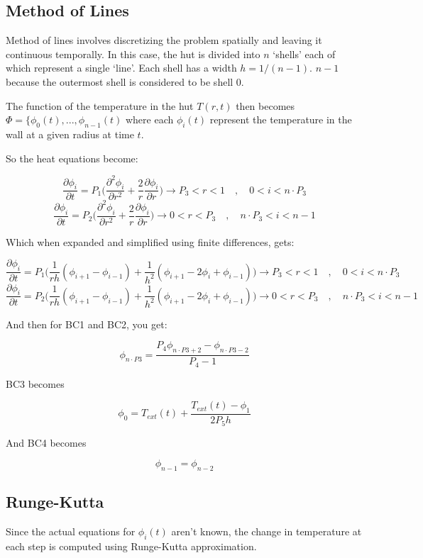 \documentclass{article}
\begin{document}
\subsection{Method of Lines}

Method of lines involves discretizing the problem spatially and leaving it continuous temporally. In this case, the hut is divided into $n$ `shells' each of which represent a single `line'. Each shell has a width $h = 1/(n-1)$. $n-1$ because the outermost shell is considered to be shell 0.

The function of the temperature in the hut $T(r,t)$ then becomes $\Phi = \{\phi_0(t), ... ,\phi_{n-1}(t)$ where each $\phi_i(t)$ represent the temperature in the wall at a given radius at time $t$.

So the heat equations become:

\[\frac{\partial \phi_i}{\partial t} = P_1 \bigg(\frac{\partial^2 \phi_i}{\partial r^2} + \frac{2}{r} \frac{\partial \phi_i}{\partial r}\bigg) \rightarrow P_3 < r < 1 \quad , \quad  0 < i < n\cdot P_3\]
\[\frac{\partial \phi_i}{\partial t} = P_2 \bigg(\frac{\partial^2 \phi_i}{\partial r^2} + \frac{2}{r} \frac{\partial \phi_i}{\partial r}\bigg) \rightarrow 0 < r < P_3 \quad , \quad  n\cdot P_3 < i < n-1\]

Which when expanded and simplified using finite differences, gets:

\[\frac{\partial \phi_i}{\partial t} = P_1 \bigg( \frac{1}{rh} (\phi_{i+1} - \phi_{i-1}) + \frac{1}{h^2} (\phi_{i+1} - 2\phi_i + \phi_{i-1}) \bigg) \rightarrow P_3 < r < 1\quad , \quad  0 < i < n\cdot P_3\]
\[\frac{\partial \phi_i}{\partial t} = P_2 \bigg( \frac{1}{rh} (\phi_{i+1} - \phi_{i-1}) + \frac{1}{h^2} (\phi_{i+1} - 2\phi_i + \phi_{i-1}) \bigg) \rightarrow 0 < r < P_3 \quad , \quad n\cdot P_3 < i < n-1\]

And then for BC1 and BC2, you get:

\[\phi_{n\cdot P3} = \frac{P_4\phi_{n\cdot P3 + 2} - \phi_{n\cdot P3 - 2}}{P_4 - 1}\]

BC3 becomes

\[\phi_0 = T_{ext}(t) + \frac{T_{ext}(t) - \phi_1}{2 P_5 h}\]

And BC4 becomes

\[\phi_{n-1} = \phi_{n-2}\]

\subsection{Runge-Kutta}

Since the actual equations for $\phi_i(t)$ aren't known, the change in temperature at each step is computed using Runge-Kutta approximation.
\end{document}
